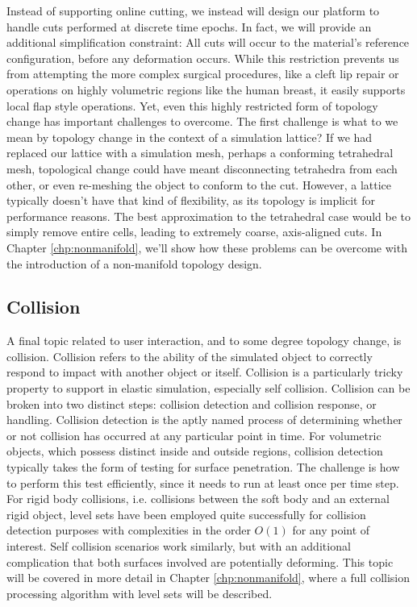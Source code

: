   Instead of supporting online cutting, we instead will design our
  platform to handle cuts performed at discrete time epochs. In fact,
  we will provide an additional simplification constraint: All cuts
  will occur to the material's reference configuration, before any
  deformation occurs. While this restriction prevents us from
  attempting the more complex surgical procedures, like a cleft lip
  repair or operations on highly volumetric regions like the human
  breast, it easily supports local flap style operations. Yet, even
  this highly restricted form of topology change has important
  challenges to overcome. The first challenge is what to we mean by
  topology change in the context of a simulation lattice? If we had
  replaced our lattice with a simulation mesh, perhaps a conforming
  tetrahedral mesh, topological change could have meant disconnecting
  tetrahedra from each other, or even re-meshing the object to conform
  to the cut. However, a lattice typically doesn't have that kind of
  flexibility, as its topology is implicit for performance reasons. The
  best approximation to the tetrahedral case would be to simply remove
  entire cells, leading to extremely coarse, axis-aligned cuts. In
  Chapter \ref{chp:nonmanifold}, we'll show how these problems can be
  overcome with the introduction of a non-manifold topology design.

  \subsection{Collision}

  A final topic related to user interaction, and to some degree
  topology change, is collision. Collision refers to the ability of
  the simulated object to correctly respond to impact with another
  object or itself. Collision is a particularly tricky property to
  support in elastic simulation, especially self collision. Collision
  can be broken into two distinct steps: collision detection and
  collision response, or handling. Collision detection is the aptly
  named process of determining whether or not collision has occurred at
  any particular point in time. For volumetric objects, which possess
  distinct inside and outside regions, collision detection typically
  takes the form of testing for surface penetration. The challenge is
  how to perform this test efficiently, since it needs to run at least
  once per time step. For rigid body collisions, i.e. collisions between
  the soft body and an external rigid object, level sets have been
  employed quite successfully for collision detection purposes with
  complexities in the order $O(1)$ for any point of
  interest. Self collision scenarios work similarly, but with an
  additional complication that both surfaces involved are potentially
  deforming. This topic will be covered in more detail in Chapter
  \ref{chp:nonmanifold}, where a full collision processing algorithm
  with level sets will be described.
  
